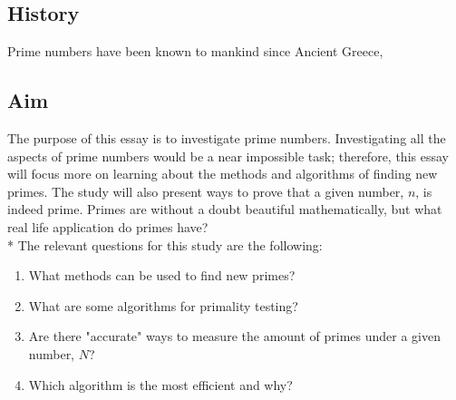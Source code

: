 \documentclass[main.tex]{subfiles}
\begin{document}
\subsection{History}
Prime numbers have been known to mankind since Ancient Greece, \cite{prime}




\subsection{Aim}
The purpose of this essay is to investigate prime numbers. Investigating all the aspects of prime numbers would be a near impossible task; therefore, this essay will focus more on learning about the methods and algorithms of finding new primes. The study will also present ways to prove that a given number, $n$, is indeed prime. Primes are without a doubt beautiful mathematically, but what real life application do primes have?
\newline
\\*
The relevant questions for this study are the following:
\begin{enumerate}
    \item What methods can be used to find new primes?
    \item What are some algorithms for primality testing?
    \item Are there "accurate" ways to measure the amount of primes under a given number, $N$?
    \item Which algorithm is the most efficient and why?
\end{enumerate}
\end{document}
